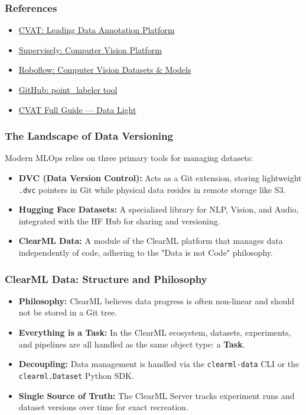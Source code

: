 \documentclass[aspectratio=169]{beamer}
\begin{document}
\begin{frame}[t]
    \frametitle{References}
    \begin{itemize}
        \item \href{https://www.cvat.ai/}{CVAT: Leading Data Annotation Platform}
        \item \href{https://supervisely.com/}{Supervisely: Computer Vision Platform}
        \item \href{https://roboflow.com/}{Roboflow: Computer Vision Datasets \& Models}
        \item \href{https://github.com/jbehley/point_labeler}{GitHub: point\_labeler tool}
        \item \href{https://blog.deepschool.ru/cvat-guide/}{CVAT Full Guide — Data Light}
    \end{itemize}
\end{frame}
\begin{frame}[t]
    \frametitle{The Landscape of Data Versioning}
    Modern MLOps relies on three primary tools for managing datasets:
    \begin{itemize}
        \item \textbf{DVC (Data Version Control):} Acts as a Git extension, storing lightweight \texttt{.dvc} pointers in Git while physical data resides in remote storage like S3.
        \item \textbf{Hugging Face Datasets:} A specialized library for NLP, Vision, and Audio, integrated with the HF Hub for sharing and versioning.
        \item \textbf{ClearML Data:} A module of the ClearML platform that manages data independently of code, adhering to the "Data is not Code" philosophy.
    \end{itemize}
\end{frame}

\begin{frame}[t]
    \frametitle{ClearML Data: Structure and Philosophy}
    \begin{itemize}
        \item \textbf{Philosophy:} ClearML believes data progress is often non-linear and should not be stored in a Git tree.
        \item \textbf{Everything is a Task:} In the ClearML ecosystem, datasets, experiments, and pipelines are all handled as the same object type: a \textbf{Task}.
        \item \textbf{Decoupling:} Data management is handled via the \texttt{clearml-data} CLI or the \texttt{clearml.Dataset} Python SDK.
        \item \textbf{Single Source of Truth:} The ClearML Server tracks experiment runs and dataset versions over time for exact recreation.
    \end{itemize}
\end{frame}
\end{document}
